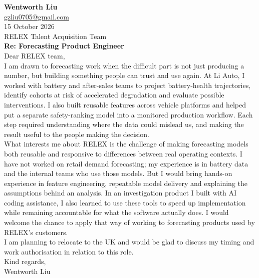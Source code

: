 \documentclass[a4paper,11pt]{article}
\begin{document}
{\large\bfseries Wentworth Liu}\\[3pt]
\href{mailto:gzliu0705@gmail.com}{gzliu0705@gmail.com}\\[16pt]
15 October 2026\\[14pt]
RELEX Talent Acquisition Team\\[14pt]
\textbf{Re: Forecasting Product Engineer}\\[18pt]

Dear RELEX team,\\[12pt]

I am drawn to forecasting work when the difficult part is not just producing a number, but building something people can trust and use again. At Li Auto, I worked with battery and after-sales teams to project battery-health trajectories, identify cohorts at risk of accelerated degradation and evaluate possible interventions. I also built reusable features across vehicle platforms and helped put a separate safety-ranking model into a monitored production workflow. Each step required understanding where the data could mislead us, and making the result useful to the people making the decision.\\[12pt]

What interests me about RELEX is the challenge of making forecasting models both reusable and responsive to differences between real operating contexts. I have not worked on retail demand forecasting; my experience is in battery data and the internal teams who use those models. But I would bring hands-on experience in feature engineering, repeatable model delivery and explaining the assumptions behind an analysis. In an investigation product I built with AI coding assistance, I also learned to use these tools to speed up implementation while remaining accountable for what the software actually does. I would welcome the chance to apply that way of working to forecasting products used by RELEX's customers.\\[12pt]

I am planning to relocate to the UK and would be glad to discuss my timing and work authorisation in relation to this role.\\[20pt]

Kind regards,\\[16pt]
Wentworth Liu
\end{document}
